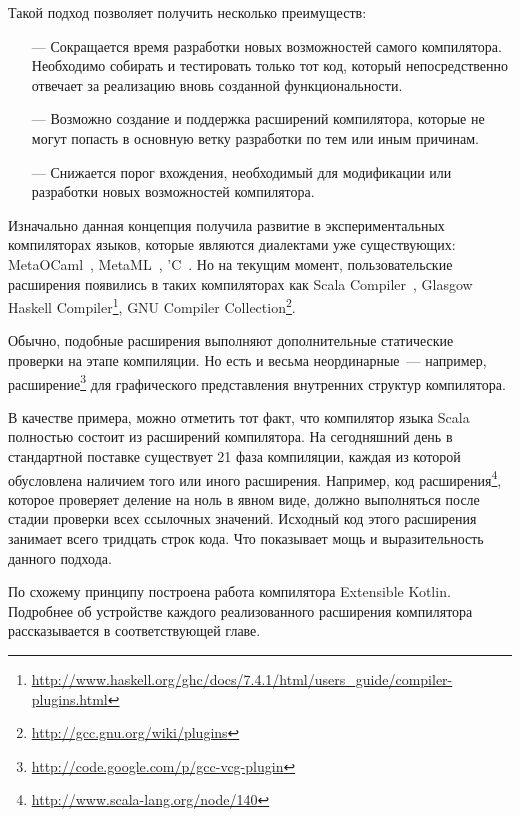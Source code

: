 Такой подход позволяет получить несколько преимуществ:
\begin{itemize}
\item[---] Сокращается время разработки новых возможностей самого компилятора. Необходимо собирать и тестировать только тот код, который непосредственно отвечает за реализацию вновь созданной функциональности.
\item[---] Возможно создание и поддержка расширений компилятора, которые не могут попасть в основную ветку разработки по тем или иным причинам.
\item[---] Снижается порог вхождения, необходимый для модификации или разработки новых возможностей компилятора.
\end{itemize}

Изначально данная концепция получила развитие в экспериментальных компиляторах языков, которые являются диалектами уже существующих: MetaOCaml~\cite{metaocaml}, MetaML~\cite{metaml}, 'C~\cite{extendible-c}.
Но на текущим момент, пользовательские расширения появились в таких компиляторах как
Scala Compiler~\cite{scala-spec},
Glasgow Haskell Compiler\footnote{\url{http://www.haskell.org/ghc/docs/7.4.1/html/users_guide/compiler-plugins.html}}, GNU Compiler Collection\footnote{\url{http://gcc.gnu.org/wiki/plugins}}.

Обычно, подобные расширения выполняют дополнительные статические проверки на этапе компиляции. Но есть и весьма неординарные~--- например, расширение\footnote{\url{http://code.google.com/p/gcc-vcg-plugin}} для графического представления внутренних структур компилятора.

В качестве примера, можно отметить тот факт, что компилятор языка Scala полностью состоит из расширений компилятора. На сегодняшний день в стандартной поставке существует 21 фаза компиляции, каждая из которой обусловлена наличием того или иного расширения. Например, код расширения\footnote{\url{http://www.scala-lang.org/node/140}}, которое проверяет деление на ноль в явном виде, должно выполняться после стадии проверки всех ссылочных значений. Исходный код этого расширения занимает всего тридцать строк кода. Что показывает мощь и выразительность данного подхода.

По схожему принципу построена работа компилятора Extensible Kotlin. Подробнее об устройстве каждого реализованного расширения компилятора рассказывается в соответствующей главе.
